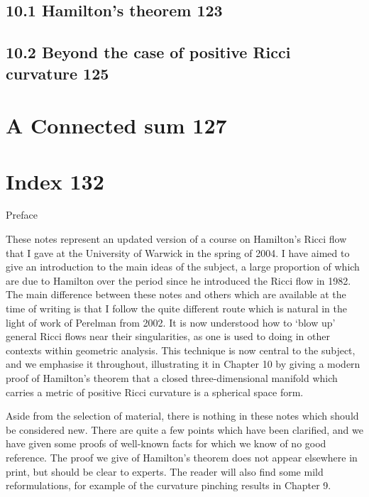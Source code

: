 \subsection*{10.1 \quad Hamilton's theorem \hfill 123}
\subsection*{10.2 \quad Beyond the case of positive Ricci curvature \hfill 125}

\section*{A \quad Connected sum \hfill 127}

\section*{Index \hfill 132}
\endgroup

\begin{center}
\vspace*{0.16\textheight}

{\Huge Preface}
\end{center}

These notes represent an updated version of a course on Hamilton’s Ricci
flow that I gave at the University of Warwick in the spring of 2004. I
have aimed to give an introduction to the main ideas of the subject, a large
proportion of which are due to Hamilton over the period since he introduced
the Ricci flow in 1982. The main difference between these notes and others
which are available at the time of writing is that I follow the quite different
route which is natural in the light of work of Perelman from 2002. It is now
understood how to ‘blow up’ general Ricci flows near their singularities,
as one is used to doing in other contexts within geometric analysis. This
technique is now central to the subject, and we emphasise it throughout,
illustrating it in Chapter 10 by giving a modern proof of Hamilton’s theorem
that a closed three-dimensional manifold which carries a metric of positive
Ricci curvature is a spherical space form.

Aside from the selection of material, there is nothing in these notes which
should be considered new. There are quite a few points which have been
clarified, and we have given some proofs of well-known facts for which we
know of no good reference. The proof we give of Hamilton’s theorem does
not appear elsewhere in print, but should be clear to experts. The reader will
also find some mild reformulations, for example of the curvature pinching
results in Chapter 9.

